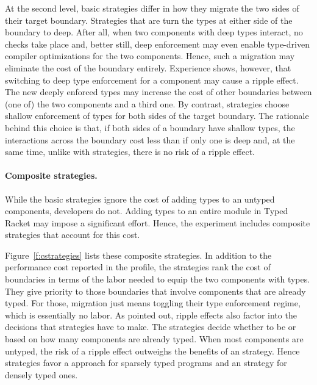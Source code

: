 At the second level, basic strategies differ in how they migrate the two sides
 of their target boundary. Strategies that are \optkw{} turn the types at either
 side of the boundary to deep. After all, when two components with deep types
 interact, no checks take place and, better still, deep enforcement may even
 enable type-driven compiler optimizations for the two components.  Hence, such
 a migration may eliminate the cost of the boundary entirely.  Experience shows,
 however, that switching to deep type enforcement for a component may cause a
 ripple effect. The new deeply enforced types may increase the cost of other
 boundaries between (one of) the two components and a third one. By contrast,
 \conkw{} strategies choose shallow enforcement of types for both sides of the
 target boundary. The rationale behind this choice is that, if both sides of a
 boundary have shallow types, the interactions across the boundary cost less
 than if only one is deep and, at the same time, unlike with \optkw{}
 strategies, there is no risk of a ripple effect.



\paragraph{Composite strategies.} While the basic strategies ignore the cost of
 adding types to an untyped components, developers do not. Adding types to an
 entire module in Typed Racket may impose a significant effort. Hence, the
 experiment includes composite strategies that account for this cost.

Figure~\ref{f:cstrategies} lists these composite strategies. In addition to the
 performance cost reported in the profile, the \costkw{} strategies rank the
 cost of boundaries in terms of the labor needed to equip the two components
 with types.  They give priority to those boundaries that involve components
 that are already typed.  For those, migration just means toggling their type
 enforcement regime, which is essentially no labor.  As pointed out, ripple
 effects also factor into the decisions that strategies have to make. The
 \confkw{} strategies decide whether to be \optkw{} or \conkw{} based on how
 many components are already typed.  When most components are untyped, the risk
 of a ripple effect outweighs the benefits of an \optkw{} strategy. Hence
 strategies favor a \conkw{} approach for sparsely typed programs and an
 \optkw{} strategy for densely typed ones.

